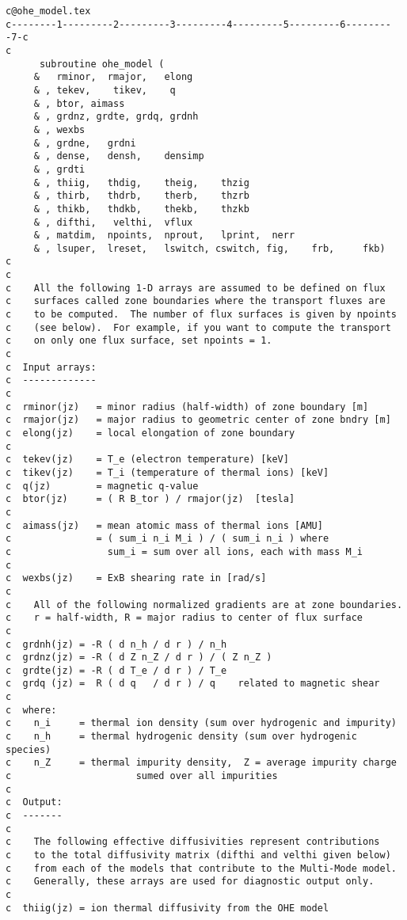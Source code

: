 \begin{verbatim}
c@ohe_model.tex
c--------1---------2---------3---------4---------5---------6---------7-c
c
      subroutine ohe_model (
     &   rminor,  rmajor,   elong
     & , tekev,    tikev,    q       
     & , btor, aimass
     & , grdnz, grdte, grdq, grdnh
     & , wexbs
     & , grdne,   grdni
     & , dense,   densh,    densimp     
     & , grdti  
     & , thiig,   thdig,    theig,    thzig
     & , thirb,   thdrb,    therb,    thzrb
     & , thikb,   thdkb,    thekb,    thzkb
     & , difthi,   velthi,  vflux
     & , matdim,  npoints,  nprout,   lprint,  nerr
     & , lsuper,  lreset,   lswitch, cswitch, fig,    frb,     fkb)
c
c
c    All the following 1-D arrays are assumed to be defined on flux
c    surfaces called zone boundaries where the transport fluxes are
c    to be computed.  The number of flux surfaces is given by npoints
c    (see below).  For example, if you want to compute the transport
c    on only one flux surface, set npoints = 1.
c
c  Input arrays:
c  -------------
c
c  rminor(jz)   = minor radius (half-width) of zone boundary [m]
c  rmajor(jz)   = major radius to geometric center of zone bndry [m]
c  elong(jz)    = local elongation of zone boundary
c
c  tekev(jz)    = T_e (electron temperature) [keV] 
c  tikev(jz)    = T_i (temperature of thermal ions) [keV]
c  q(jz)        = magnetic q-value
c  btor(jz)     = ( R B_tor ) / rmajor(jz)  [tesla]
c
c  aimass(jz)   = mean atomic mass of thermal ions [AMU]
c               = ( sum_i n_i M_i ) / ( sum_i n_i ) where
c                 sum_i = sum over all ions, each with mass M_i
c
c  wexbs(jz)    = ExB shearing rate in [rad/s]
c
c    All of the following normalized gradients are at zone boundaries.
c    r = half-width, R = major radius to center of flux surface
c
c  grdnh(jz) = -R ( d n_h / d r ) / n_h
c  grdnz(jz) = -R ( d Z n_Z / d r ) / ( Z n_Z )
c  grdte(jz) = -R ( d T_e / d r ) / T_e
c  grdq (jz) =  R ( d q   / d r ) / q    related to magnetic shear
c
c  where:
c    n_i     = thermal ion density (sum over hydrogenic and impurity)
c    n_h     = thermal hydrogenic density (sum over hydrogenic species)
c    n_Z     = thermal impurity density,  Z = average impurity charge
c                      sumed over all impurities
c
c  Output:
c  -------
c
c    The following effective diffusivities represent contributions
c    to the total diffusivity matrix (difthi and velthi given below)
c    from each of the models that contribute to the Multi-Mode model.
c    Generally, these arrays are used for diagnostic output only.
c
c  thiig(jz) = ion thermal diffusivity from the OHE model

\end{verbatim}
